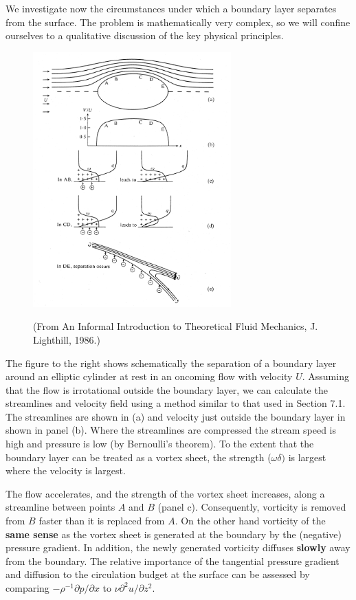 \documentclass[10pt]{report}
\begin{document}
We investigate now the circumstances under which a boundary layer separates
from the surface. The problem is mathematically very complex, so we will
confine ourselves to a qualitative discussion of the key physical
principles.


\begin{figure}
\centerline{\includegraphics[width=3in]{Section76.pdf}}
{\bigskip}
\begin{center}
{\small (From An Informal Introduction to Theoretical Fluid Mechanics, J. Lighthill, 1986.)}
\end{center}
\label{fig4.6}
\caption{ }
\end{figure}

The figure to the right shows schematically the separation of a boundary layer around an
elliptic cylinder at rest in an oncoming flow with velocity $U$. Assuming that
the flow is irrotational outside the boundary layer, we can calculate the
streamlines and velocity field using a method similar to that used in
Section 7.1. The streamlines are shown in (a) and velocity just outside the
boundary layer in shown in panel (b). Where the streamlines are compressed
the stream speed is high and pressure is low (by Bernoulli's theorem). To
the extent that the boundary layer can be treated as a vortex sheet, the
strength ($\omega \delta )$ is largest where the velocity is largest.

The flow accelerates, and the strength of the vortex sheet increases, along
a streamline between points $A$ and $B$ (panel c). Consequently, vorticity is
removed from $B$ faster than it is replaced from $A$. On the other hand
vorticity of the \textbf{same sense} as the vortex sheet is generated at the
boundary by the (negative) pressure gradient. In addition, the newly
generated vorticity diffuses \textbf{slowly} away from the boundary. The
relative importance of the tangential pressure gradient and diffusion to the
circulation budget at the surface can be assessed by comparing $-\rho
^{-1}{\partial p} / {\partial x}$ to $\nu {\partial ^2u}
/ {\partial z^2}$.
\end{document}
